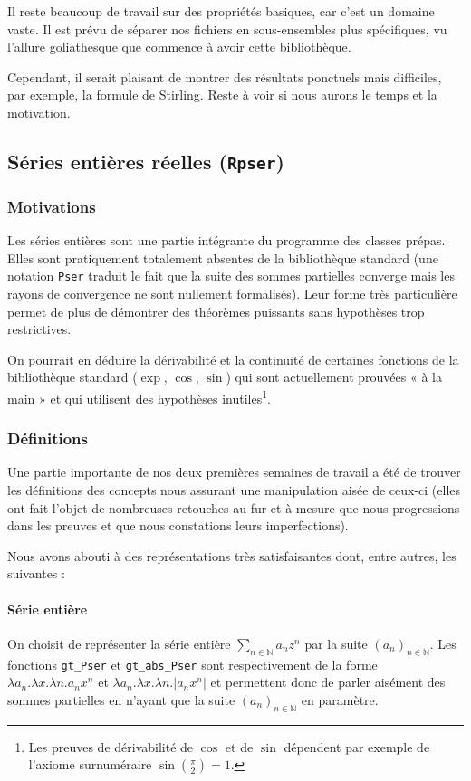 \documentclass{article}
\newcommand{\coqcode}[1]{\texttt{#1}}
\begin{document}
Il reste beaucoup de travail sur des propriétés basiques, car c'est un domaine vaste. Il est prévu de séparer nos fichiers en sous-ensembles plus spécifiques, vu l'allure goliathesque que commence à avoir cette bibliothèque.

Cependant, il serait plaisant de montrer des résultats ponctuels mais difficiles, par exemple, la formule de Stirling. Reste à voir si nous aurons le temps et la motivation.

\subsection{Séries entières réelles (\coqcode{Rpser})}

\subsubsection{Motivations}

Les séries entières sont une partie intégrante du programme des classes prépas. Elles sont pratiquement totalement absentes de la bibliothèque standard (une notation \coqcode{Pser} traduit le fait que la suite des sommes partielles converge mais les rayons de convergence ne sont nullement formalisés). Leur forme très particulière permet de plus de démontrer des théorèmes puissants sans hypothèses trop restrictives.

On pourrait en déduire la dérivabilité et la continuité de certaines fonctions de la bibliothèque standard ($\exp$, $\cos$, $\sin$) qui sont actuellement prouvées « à la main » et qui utilisent des hypothèses inutiles\footnote{Les preuves de dérivabilité de $\cos$ et de $\sin$ dépendent par exemple de l'axiome surnuméraire $\sin\left(\frac{\pi}{2}\right) = 1$.}.

\subsubsection{Définitions}

Une partie importante de nos deux premières semaines de travail a été de trouver les définitions des concepts nous assurant une manipulation aisée de ceux-ci (elles ont fait l'objet de nombreuses retouches au fur et à mesure que nous progressions dans les preuves et que nous constations leurs imperfections).

Nous avons abouti à des représentations très satisfaisantes dont, entre autres, les suivantes :

\paragraph{Série entière} On choisit de représenter la série entière $\sum_{n\in \mathbb{N}} a_n z^n$ par la suite $\left(a_n\right)_{n\in \mathbb{N}}$. Les fonctions \coqcode{gt\_Pser} et \coqcode{gt\_abs\_Pser} sont respectivement de la forme $\lambda a_n.\lambda x.\lambda n.a_n x ^ n$ et $\lambda a_n.\lambda x.\lambda n.\left|a_n x ^ n\right|$ et permettent donc de parler aisément des sommes partielles en n'ayant que la suite $\left(a_n\right)_{n\in \mathbb{N}}$ en paramètre.
\end{document}

